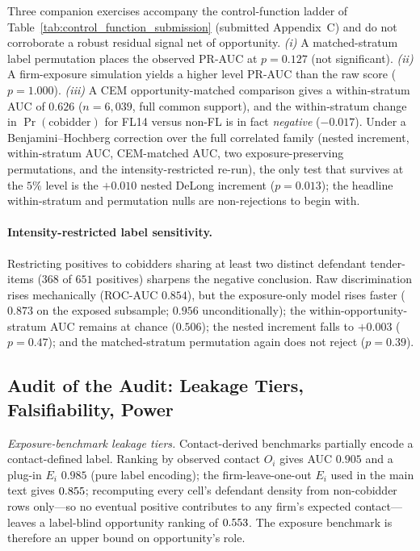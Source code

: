 Three companion exercises accompany the control-function ladder of
Table~\ref{tab:control_function_submission} (submitted Appendix~C) and
do not corroborate a robust residual signal net of opportunity.
\emph{(i)} A matched-stratum label permutation places the observed
PR-AUC at $p=0.127$ (not significant). \emph{(ii)} A firm-exposure
simulation yields a higher level PR-AUC than the raw score ($p=1.000$).
\emph{(iii)} A CEM opportunity-matched comparison gives a within-stratum
AUC of $0.626$ ($n=6{,}039$, full common support), and the within-stratum
change in $\Pr(\text{cobidder})$ for FL14 versus non-FL is in fact
\emph{negative} ($-0.017$). Under a Benjamini--Hochberg correction over
the full correlated family (nested increment, within-stratum AUC,
CEM-matched AUC, two exposure-preserving permutations, and the
intensity-restricted re-run), the only test that survives at the $5\%$
level is the $+0.010$ nested DeLong increment ($p=0.013$); the headline
within-stratum and permutation nulls are non-rejections to begin with.

\paragraph{Intensity-restricted label sensitivity.} Restricting
positives to cobidders sharing at least two distinct defendant
tender-items ($368$ of $651$ positives) sharpens the negative
conclusion. Raw discrimination rises mechanically (ROC-AUC $0.854$), but
the exposure-only model rises faster ($0.873$ on the exposed subsample;
$0.956$ unconditionally); the within-opportunity-stratum AUC remains at
chance ($0.506$); the nested increment falls to $+0.003$ ($p=0.47$); and
the matched-stratum permutation again does not reject ($p=0.39$).

\subsection{Audit of the Audit: Leakage Tiers, Falsifiability, Power}
\label{supp:audit_armor}

\emph{Exposure-benchmark leakage tiers.} Contact-derived benchmarks
partially encode a contact-defined label. Ranking by observed contact
$O_i$ gives AUC $0.905$ and a plug-in $E_i$ $0.985$ (pure label
encoding); the firm-leave-one-out $E_i$ used in the main text gives
$0.855$; recomputing every cell's defendant density from
non-cobidder rows only---so no eventual positive contributes to any
firm's expected contact---leaves a label-blind opportunity ranking of
$0.553$. The exposure benchmark is therefore an upper bound on
opportunity's role.

